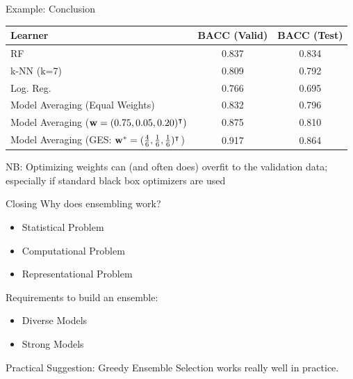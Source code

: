 \documentclass[10pt,compress,t,notes=noshow, xcolor=table]{beamer}
\begin{document}
\begin{vbframe}{Example: Conclusion}
\begin{table}[h]
\centering
\begin{tabular}{lcc}
\hline
\textbf{Learner} & \textbf{BACC} (Valid) & \textbf{BACC} (Test) \\
\hline
RF & 0.837 & 0.834 \\
k-NN (k=7) & 0.809 & 0.792 \\
Log. Reg. & 0.766 & 0.695 \\
Model Averaging (Equal Weights) & 0.832 & 0.796 \\
Model Averaging ($\mathbf{w} = (0.75, 0.05, 0.20)^\intercal)$ & 0.875 & 0.810 \\
Model Averaging (GES: $\mathbf{w}^{*} = (\frac{4}{6}, \frac{1}{6}, \frac{1}{6})^\intercal$) & 0.917 & 0.864\\
\hline
\end{tabular}
\label{table:learners_valid_test_final}
\end{table}
\vfill
NB: Optimizing weights can (and often does) overfit to the validation data; especially if standard black box optimizers are used\\
\end{vbframe}


\begin{vbframe}{Closing}
\vfill
Why does ensembling work? \href{https://link.springer.com/content/pdf/10.1007/3-540-45014-9_1.pdf?pdf}{}
\begin{itemize}
    \item Statistical Problem
    \item Computational Problem
    \item Representational Problem
\end{itemize}
\vfill
Requirements to build an ensemble:
\begin{itemize}
    \item Diverse Models
    \item Strong Models
\end{itemize}
\vfill
Practical Suggestion: Greedy Ensemble Selection works really well in practice.
\vfill
\end{vbframe}



\endlecture
\end{document}
